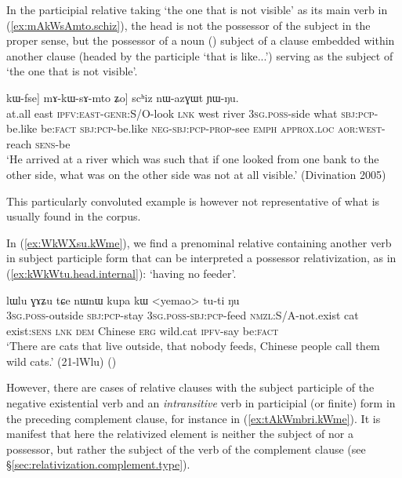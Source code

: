  In the participial relative taking  `the one that is not visible' as its main verb in (\ref{ex:mAkWsAmto.schiz}), the head  is not the possessor of the subject in the proper sense, but the possessor of a noun () subject of a clause embedded within another clause (headed by the participle  `that is like...') serving as the subject of  `the one that is not visible'.  

  \begin{exe}
\ex \label{ex:mAkWsAmto.schiz}
 \gll  [maka tɕekɯ ku-kɯ-ru tɕe tɕendi \textbf{smar} [[ɯ-βzɯr tɕʰi kɯ-fse ŋu] kɯ-fse] mɤ-kɯ-sɤ-mto ʑo] scʰiz nɯ-azɣɯt ɲɯ-ŋu. \\
 at.all east \textsc{ipfv}:\textsc{east}-\textsc{genr}:S/O-look \textsc{lnk} west river \textsc{3sg}.\textsc{poss}-side what \textsc{sbj}:\textsc{pcp}-be.like be:\textsc{fact} \textsc{sbj}:\textsc{pcp}-be.like \textsc{neg}-\textsc{sbj}:\textsc{pcp}-\textsc{prop}-see \textsc{emph} \textsc{approx}.\textsc{loc} \textsc{aor}:\textsc{west}-reach \textsc{sens}-be \\
\glt `He arrived at a river which was such that if one looked from one bank to the other side, what was on the other side was not at all visible.' (Divination 2005)
 \end{exe}
 
 This particularly convoluted example is however not representative of what is usually found in the corpus.

In (\ref{ex:WkWXsu.kWme}), we find a prenominal relative containing another verb in subject participle form that can be interpreted a possessor relativization, as in (\ref{ex:kWkWtu.head.internal}):   `having no feeder'.

\begin{exe}
\ex \label{ex:WkWXsu.kWme}
  lɯlu ɣɤʑu tɕe nɯnɯ kupa kɯ <yemao> tu-ti ŋu \\
 \textsc{3sg}.\textsc{poss}-outside \textsc{sbj}:\textsc{pcp}-stay \textsc{3sg}.\textsc{poss}-\textsc{sbj}:\textsc{pcp}-feed \textsc{nmzl}:S/A-not.exist cat exist:\textsc{sens} \textsc{lnk} \textsc{dem} Chinese \textsc{erg} wild.cat \textsc{ipfv}-say be:\textsc{fact} \\
 \glt `There are cats that live outside, that nobody feeds, Chinese people call them wild cats.' (21-lWlu)
()
 \end{exe}

However, there are cases of relative clauses with the subject participle of the negative existential verb  and an \textit{intransitive} verb in participial (or finite) form in the preceding complement clause, for instance  in (\ref{ex:tAkWmbri.kWme}). It is manifest that here the relativized element is neither the subject of  nor a possessor, but rather the subject of the verb of the complement clause  (see §\ref{sec:relativization.complement.type}).

